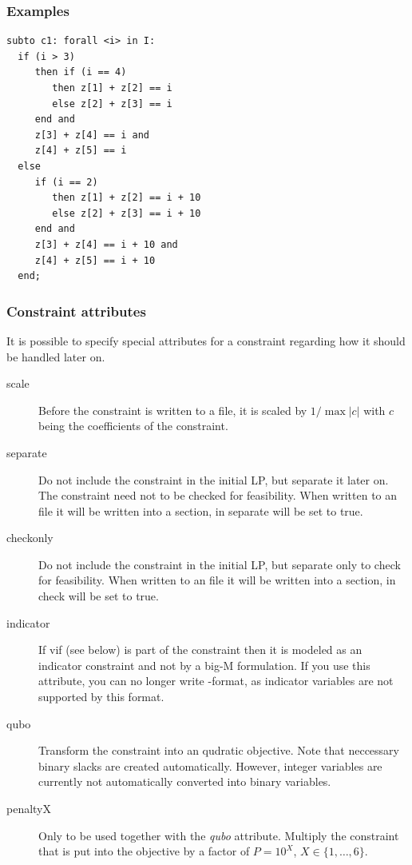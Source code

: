\subsubsection{Examples}
{\small
\begin{verbatim}
subto c1: forall <i> in I:
  if (i > 3)
     then if (i == 4)
        then z[1] + z[2] == i
        else z[2] + z[3] == i
     end and
     z[3] + z[4] == i and
     z[4] + z[5] == i
  else
     if (i == 2)
        then z[1] + z[2] == i + 10
        else z[2] + z[3] == i + 10
     end and
     z[3] + z[4] == i + 10 and
     z[4] + z[5] == i + 10
  end;
\end{verbatim}
}


\subsubsection{Constraint attributes}
It is possible to specify special attributes for a constraint regarding
how it should be handled later on.

\begin{description}
\item[scale]
  Before the constraint is written to a file, it is scaled by
  $1/\max |c|$ with $c$ being the coefficients of the constraint.
\item[separate]
  Do not include the constraint in the initial LP, but separate it later on.
  The constraint need not to be checked for feasibility.
  When written to an \lpf file it will be written into a  section, in \scip separate will be set to true.
\item[checkonly]
  Do not include the constraint in the initial LP, but separate only to
  check for feasibility.
  When written to an \lpf file it will be written into a  section, in \scip check will be set to true.
\item[indicator]
  If vif (see below) is part of the constraint then it is modeled as an
  indicator constraint and not by a big-M formulation.
  If you use this attribute, you can no longer write \mps-format, as
  indicator variables are not supported by this format.
\item[qubo]
  Transform the constraint into an qudratic objective.
  Note that neccessary binary slacks are created automatically.
  However, integer variables are currently not automatically
  converted into binary variables.
\item[penaltyX] Only to be used together with the \emph{qubo}
attribute. Multiply the constraint that is put into the objective
by a factor of $P=10^X$, $X\in\{1,\ldots,6\}$.
\end{description}


